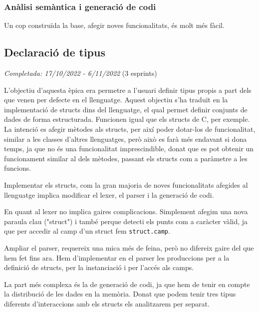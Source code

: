 ﻿\documentclass{article}
\begin{document}
            \subsubsection{Anàlisi semàntica i generació de codi}

        Un cop construïda la base, afegir noves funcionalitats, és molt més fàcil.


    \subsection{Declaració de tipus}
        \textit{Completada: 17/10/2022 - 6/11/2022} (3 esprints)
        
        L'objectiu d'aquesta èpica era permetre a l'usuari definir tipus propis
        a part dels que venen per defecte en el llenguatge. Aquest objectiu s'ha
        traduït en la implementació de structs dins del llenguatge, el qual permet
        definir conjunts de dades de forma estructurada. Funcionen igual que els
        structs de C, per exemple. La intenció es afegir mètodes als structs, per
        així poder dotar-los de funcionalitat, similar a les classes d'altres
        llenguatges, però això es farà més endavant si dona temps, ja que no és
        una funcionalitat imprescindible, donat que es pot obtenir un funcionament
        similar al dels mètodes, passant els structs com a paràmetre a les funcions.

        Implementar els structs, com la gran majoria de noves funcionalitats
        afegides al llenguatge implica modificar el lexer, el parser i la 
        generació de codi. 

        En quant al lexer no implica gaires complicacions. 
        Simplement afegim una nova paraula clau ("struct") i també perque detecti
        els punts com a caràcter vàlid, ja que per accedir al camp d'un struct
        fem \texttt{struct.camp}.

        Ampliar el parser, requereix una mica més de feina, però no difereix 
        gaire del que hem fet fins ara. Hem d'implementar en el parser les 
        produccions per a la definició de structs, per la instanciació i 
        per l'accés als camps.

       La part més complexa és la de generació de codi, ja que hem de tenir en
       compte la distribució de les dades en la memòria. Donat que podem tenir
       tres tipus diferents d'interaccions amb els structs els analitzarem per 
       separat.
\end{document}
